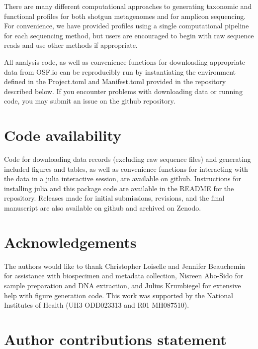 \documentclass[fleqn,10pt]{wlscirep}
\begin{document}
There are many different computational approaches to generating taxonomic and functional profiles
for both shotgun metagenomes and for amplicon sequencing.
For convenience, we have provided profiles using a single computational pipeline for each sequencing method,
but users are encouraged to begin with raw sequence reads and use other methods if appropriate.

All analysis code, as well as convenience functions for downloading appropriate data from OSF.io
can be reproducibly run by instantiating the environment defined in the Project.toml and Manifest.toml
provided in the repository described below.
If you encounter problems with downloading data or running code, you may submit an issue on the github repository.

\section*{Code availability}

Code for downloading data records (excluding raw sequence files) and generating included figures and tables,
as well as convenience functions for interacting with the data in a julia interactive session,
are available on github.
Instructions for installing julia and this package code are available in the README for the repository.
Releases made for initial submissions, revisions, and the final manuscript
are also available on github and archived on Zenodo.



\section*{Acknowledgements}

The authors would like to thank Christopher Loiselle and Jennifer Beauchemin
for assistance with biospecimen and metadata collection,
Nisreen Abo-Sido for sample preparation and DNA extraction,
and Julius Krumbiegel for extensive help with figure generation code. 
This work was supported by the National Institutes of Health (UH3 ODD023313 and R01 MH087510). 

\section*{Author contributions statement}
\end{document}
